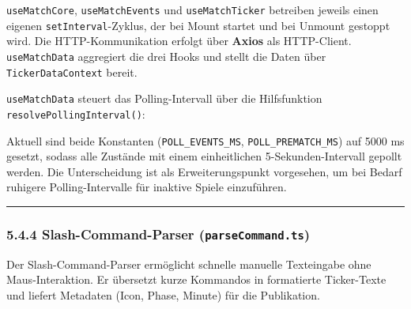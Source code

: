 \texttt{useMatchCore}, \texttt{useMatchEvents} und
\texttt{useMatchTicker} betreiben jeweils einen eigenen
\texttt{setInterval}-Zyklus, der bei Mount startet und bei Unmount
gestoppt wird. Die HTTP-Kommunikation erfolgt über \textbf{Axios} als
HTTP-Client. \texttt{useMatchData} aggregiert die drei Hooks und stellt
die Daten über \texttt{TickerDataContext} bereit.

\texttt{useMatchData} steuert das Polling-Intervall über die
Hilfsfunktion \texttt{resolvePollingInterval()}:

\begin{Shaded}
\begin{Highlighting}[]
  \OperatorTok{:}  \OperatorTok{|} \NormalTok{)}\OperatorTok{:} \NormalTok{ \{}
  \OperatorTok{===}  \OperatorTok{||}\OperatorTok{===} \NormalTok{) }\OperatorTok{;} 
  \OperatorTok{==} \NormalTok{) }\OperatorTok{;} 
  \OperatorTok{;} 
\NormalTok{\}}
\end{Highlighting}
\end{Shaded}

Aktuell sind beide Konstanten (\texttt{POLL\_EVENTS\_MS},
\texttt{POLL\_PREMATCH\_MS}) auf 5000 ms gesetzt, sodass alle Zustände
mit einem einheitlichen 5-Sekunden-Intervall gepollt werden. Die
Unterscheidung ist als Erweiterungspunkt vorgesehen, um bei Bedarf
ruhigere Polling-Intervalle für inaktive Spiele einzuführen.

\begin{center}\rule{0.5\linewidth}{0.5pt}\end{center}

\subsubsection{\texorpdfstring{5.4.4 Slash-Command-Parser
(\texttt{parseCommand.ts})}{5.4.4 Slash-Command-Parser (parseCommand.ts)}}\label{slash-command-parser-parsecommand.ts}

Der Slash-Command-Parser ermöglicht schnelle manuelle Texteingabe ohne
Maus-Interaktion. Er übersetzt kurze Kommandos in formatierte
Ticker-Texte und liefert Metadaten (Icon, Phase, Minute) für die
Publikation.

